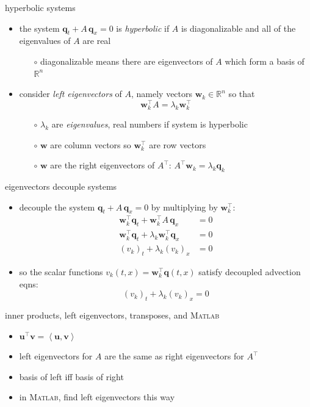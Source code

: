 \documentclass[10pt,hyperref]{beamer}
\newcommand{\bq}{\mathbf{q}}
\newcommand{\bv}{\mathbf{v}}
\newcommand{\bu}{\mathbf{u}}
\newcommand{\bw}{\mathbf{w}}
\newcommand{\RR}{\mathbb{R}}
\newcommand{\Matlab}{\textsc{Matlab}\xspace}
\newcommand{\ip}[2]{\left<#1,#2\right>}
\begin{document}
\begin{frame}{hyperbolic systems}

\begin{itemize}
\item the system $\bq_t + A\, \bq_x=0$ is \emph{hyperbolic} if $A$ is diagonalizable and all of the eigenvalues of $A$ are real
    \begin{itemize}
    \item[$\circ$] diagonalizable means there are eigenvectors of $A$ which form a basis of $\RR^n$
    \end{itemize}
\item consider \emph{left eigenvectors} of $A$, namely vectors $\bw_k \in \RR^n$ so that
    $$\bw_k^\top A = \lambda_k \bw_k^\top$$

\vspace{-2mm}
    \begin{itemize}
    \item[$\circ$] $\lambda_k$ are \emph{eigenvalues}, real numbers if system is hyperbolic
    \item[$\circ$] $\bw$ are column vectors so $\bw_k^\top$ are row vectors
    \item[$\circ$] $\bw$ are the right eigenvectors of $A^\top$: \qquad $A^\top \bw_k = \lambda_k \bq_k$
    \end{itemize}
\end{itemize}
\end{frame}


\begin{frame}{eigenvectors decouple systems}

\begin{itemize}
\item decouple the system $\bq_t + A\, \bq_x=0$ by multiplying by $\bw_k^\top$:
\begin{align*}
\bw_k^\top \bq_t + \bw_k^\top A\, \bq_x &= 0 \\
\bw_k^\top \bq_t + \lambda_k \bw_k^\top \bq_x &= 0 \\
(v_k)_t + \lambda_k (v_k)_x &= 0
\end{align*}
\item so the scalar functions $v_k(t,x) = \bw_k^\top \bq(t,x)$ satisfy decoupled advection eqns:
   $$(v_k)_t + \lambda_k (v_k)_x = 0$$
\end{itemize}
\end{frame}


\begin{frame}{inner products, left eigenvectors, transposes, and \Matlab}

\begin{itemize}
\item $\bu^\top \bv = \ip{\bu}{\bv}$
\item left eigenvectors for $A$ are the same as right eigenvectors for $A^\top$
\item basis of left iff basis of right
\item in \Matlab, find left eigenvectors this way
\end{itemize}
\end{frame}
\end{document}

